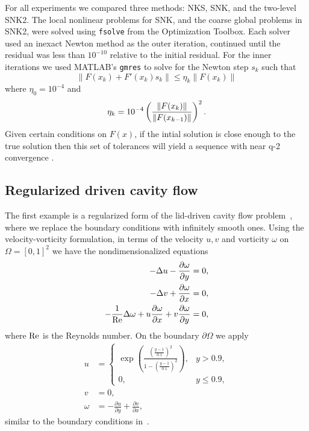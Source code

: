 For all experiments we compared three methods: NKS, SNK, and the two-level SNK2. The local nonlinear problems for SNK, and the coarse global problems in SNK2, were solved using \texttt{fsolve} from the Optimization Toolbox. Each solver used an inexact Newton method as the outer iteration, continued until the residual was less than $10^{-10}$ relative to the initial residual. For the inner iterations we used MATLAB's \texttt{gmres} to solve for the Newton step $s_k$ such that
\begin{equation}
  \| F(x_k) + F'(x_k)s_k \| \leq \eta_k \| F(x_k) \|	
\end{equation}
where $\eta_0 = 10^{-4}$ and
\begin{equation}
  \label{eq:forcing}
  \eta_k = 10^{-4} \left( \frac{\| F(x_k) \|}{\| F(x_{k-1})\|} \right)^2.	
\end{equation}
Given certain conditions on $F(x)$, if the intial solution is close enough to the true solution then this set of tolerances will yield a sequence with near q-2 convergence \cite{Eisenstat1996}. 


\subsection{Regularized driven cavity flow}
\label{sec:cavity}
The first example is a regularized form of the lid-driven cavity flow problem~\cite{hirsch2007numerical}, where we replace the boundary conditions with infinitely smooth ones. Using the velocity-vorticity formulation, in terms of the velocity $u,v$ and vorticity $\omega$ on $\Omega = [0,1]^2$ we have the nondimensionalized equations
\begin{equation}
  \begin{aligned}
    -\Delta u - \frac{\partial \omega}{\partial y} &=0, \\
    -\Delta v + \frac{\partial \omega}{\partial x} &=0, \\
    -\frac{1}{\text{Re}} \Delta \omega + u \frac{\partial \omega}{\partial x} + v \frac{\partial \omega}{\partial y} &=0,
  \end{aligned}
  \label{reg_cavity_flow}
\end{equation}
where $\text{Re}$ is the Reynolds number. On the boundary $\partial \Omega$ we apply
\begin{equation}
  \begin{aligned}
    u &= \begin{cases}
      \exp \left(\frac{\left(\frac{y-1}{0.1}\right)^2}{1-\left(\frac{y-1}{0.1}\right)^2}\right), & y>0.9, \\
      0, & y \leq 0.9,
    \end{cases} \\
    v &= 0, \\
    \omega &= - \frac{\partial u}{\partial y} + \frac{\partial v}{\partial x},
  \end{aligned}
  \label{cavityflow_initalguess}
\end{equation}
similar to the boundary conditions in~\cite{shen1990numerical}.

